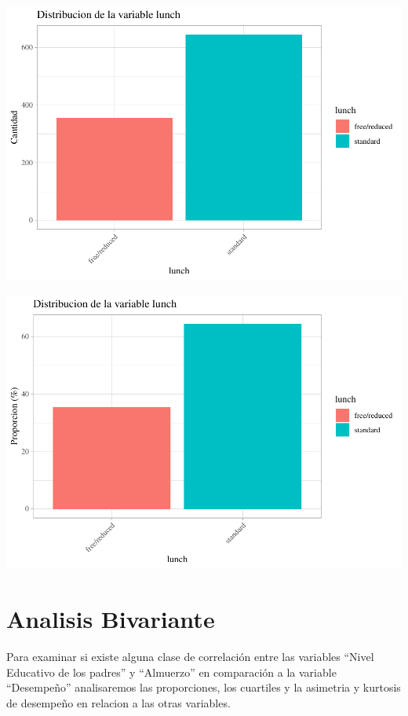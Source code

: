 \documentclass[
]{article}
\begin{document}
\begin{center}\includegraphics{Trabajo-Grupo-6.-Students-performance_files/figure-latex/unnamed-chunk-6-1} \end{center}

\begin{center}\includegraphics{Trabajo-Grupo-6.-Students-performance_files/figure-latex/unnamed-chunk-6-2} \end{center}

\section{Analisis Bivariante}\label{analisis-bivariante}

Para examinar si existe alguna clase de correlación entre las variables
``Nivel Educativo de los padres'' y ``Almuerzo'' en comparación a la
variable ``Desempeño'' analisaremos las proporciones, los cuartiles y la
asimetria y kurtosis de desempeño en relacion a las otras variables.
\end{document}
